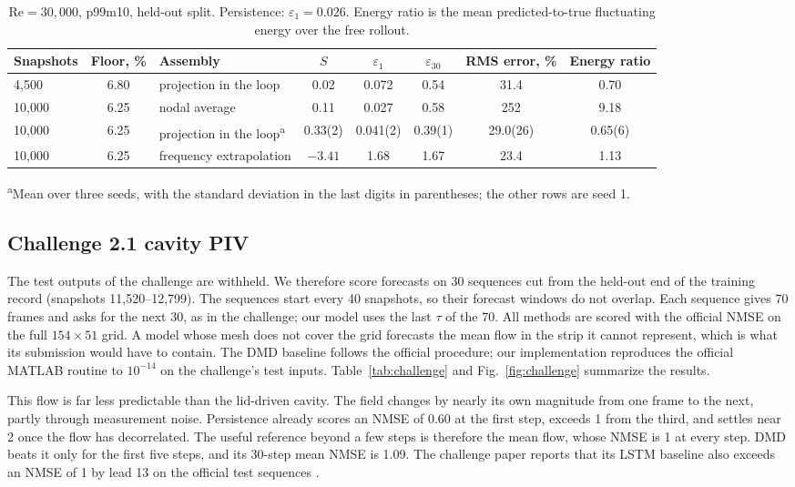 \documentclass[conf]{new-aiaa}
\newcommand{\Rey}{\mathrm{Re}}
\begin{document}
\begin{table}[!tbp]
  \centering
  \small
  \caption{$\Rey=30{,}000$, p99m10, held-out split. Persistence: $\varepsilon_1=0.026$. Energy ratio is the mean predicted-to-true fluctuating energy over the free rollout.}
  \label{tab:re30k}
  \begin{tabular}{lcl ccccc}
    \toprule
    Snapshots & Floor, \% & Assembly & $S$ & $\varepsilon_{1}$ & $\varepsilon_{30}$ & RMS error, \% & Energy ratio \\
    \midrule
    4,500 & 6.80 & projection in the loop & 0.02 & 0.072 & 0.54 & 31.4 & 0.70 \\
    10,000 & 6.25 & nodal average & 0.11 & 0.027 & 0.58 & 252 & 9.18 \\
    10,000 & 6.25 & projection in the loop\textsuperscript{a} & 0.33(2) & 0.041(2) & 0.39(1) & 29.0(26) & 0.65(6) \\
    10,000 & 6.25 & frequency extrapolation \cite{morton2026scitech} & $-3.41$ & 1.68 & 1.67 & 23.4 & 1.13 \\
    \bottomrule
  \end{tabular}

  \smallskip
  {\footnotesize \textsuperscript{a}Mean over three seeds, with the standard deviation in the last digits in parentheses; the other rows are seed 1.}
\end{table}

\subsection{Challenge 2.1 cavity PIV}
\label{sec:res_challenge}
The test outputs of the challenge are withheld. We therefore score forecasts on 30 sequences cut from the held-out end of the training record (snapshots 11,520--12,799). The sequences start every 40 snapshots, so their forecast windows do not overlap. Each sequence gives 70 frames and asks for the next 30, as in the challenge; our model uses the last $\tau$ of the 70. All methods are scored with the official NMSE on the full $154\times51$ grid. A model whose mesh does not cover the grid forecasts the mean flow in the strip it cannot represent, which is what its submission would have to contain. The DMD baseline follows the official procedure; our implementation reproduces the official MATLAB routine to $10^{-14}$ on the challenge's test inputs. Table~\ref{tab:challenge} and Fig.~\ref{fig:challenge} summarize the results.

This flow is far less predictable than the lid-driven cavity. The field changes by nearly its own magnitude from one frame to the next, partly through measurement noise. Persistence already scores an NMSE of 0.60 at the first step, exceeds 1 from the third, and settles near 2 once the flow has decorrelated. The useful reference beyond a few steps is therefore the mean flow, whose NMSE is 1 at every step. DMD beats it only for the first five steps, and its 30-step mean NMSE is 1.09. The challenge paper reports that its LSTM baseline also exceeds an NMSE of 1 by lead 13 on the official test sequences \cite{schmidt2026challenge}.
\end{document}
